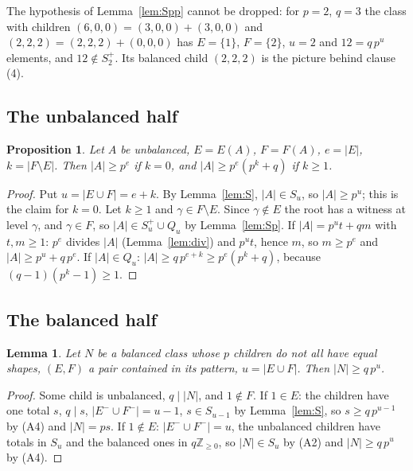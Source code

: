 \documentclass[11pt,a4paper]{amsart}
\newtheorem{proposition}[theorem]{Proposition}
\newtheorem{lemma}[theorem]{Lemma}
\theoremstyle{definition}
\theoremstyle{remark}
\newcommand{\Z}{\mathbb{Z}}
\newcommand{\Sp}{S^{+}}
\begin{document}
The hypothesis of Lemma~\ref{lem:Spp} cannot be dropped: for $p=2$, $q=3$ the class with children
$(6,0,0)=(3,0,0)+(3,0,0)$ and $(2,2,2)=(2,2,2)+(0,0,0)$ has $E=\{1\}$, $F=\{2\}$, $u=2$ and $12=q\,p^u$
elements, and $12\notin\Sp_2$. Its balanced child $(2,2,2)$ is the picture behind clause (4).

\subsection{The unbalanced half}

\begin{proposition}\label{prop:U}
Let $A$ be unbalanced, $E=E(A)$, $F=F(A)$, $e=|E|$, $k=|F\setminus E|$. Then $|A|\ge p^{e}$ if $k=0$, and
$|A|\ge p^{e}(p^{k}+q)$ if $k\ge1$.
\end{proposition}
\begin{proof}
Put $u=|E\cup F|=e+k$. By Lemma~\ref{lem:S}, $|A|\in S_u$, so $|A|\ge p^{u}$; this is the claim for $k=0$.
Let $k\ge1$ and $\gamma\in F\setminus E$. Since $\gamma\notin E$ the root has a witness at level $\gamma$, and $\gamma\in F$, so
$|A|\in\Sp_u\cup Q_u$ by Lemma~\ref{lem:Sp}. If $|A|=p^ut+qm$ with $t,m\ge1$: $p^e$ divides $|A|$
(Lemma~\ref{lem:div}) and $p^ut$, hence $m$, so $m\ge p^e$ and $|A|\ge p^u+q\,p^e$. If $|A|\in Q_u$:
$|A|\ge q\,p^{e+k}\ge p^e(p^k+q)$, because $(q-1)(p^k-1)\ge1$.
\end{proof}

\subsection{The balanced half}

\begin{lemma}\label{lem:bal}
Let $N$ be a balanced class whose $p$ children do not all have equal shapes, $(E,F)$ a pair contained in its
pattern, $u=|E\cup F|$. Then $|N|\ge q\,p^{u}$.
\end{lemma}
\begin{proof}
Some child is unbalanced, $q\mid|N|$, and $1\notin F$. If $1\in E$: the children have one total $s$, $q\mid s$,
$|E^-\cup F^-|=u-1$, $s\in S_{u-1}$ by Lemma~\ref{lem:S}, so $s\ge q\,p^{u-1}$ by (A4) and $|N|=ps$. If
$1\notin E$: $|E^-\cup F^-|=u$, the unbalanced children have totals in $S_u$ and the balanced ones in
$q\Z_{\ge0}$, so $|N|\in S_u$ by (A2) and $|N|\ge q\,p^u$ by (A4).
\end{proof}
\end{document}
